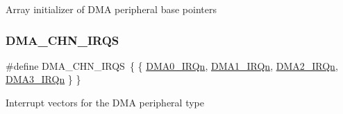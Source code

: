 Array initializer of D\+MA peripheral base pointers \mbox{\label{group___d_m_a___peripheral___access___layer_ga6defb6ef05bbbec3e07f8d2610756b7b}} 
\subsubsection{\texorpdfstring{DMA\_CHN\_IRQS}{DMA\_CHN\_IRQS}}
{\footnotesize\ttfamily \#define D\+M\+A\+\_\+\+C\+H\+N\+\_\+\+I\+R\+QS~\{ \{ \mbox{\hyperlink{group___interrupt__vector__numbers_gga666eb0caeb12ec0e281415592ae89083a54cf3bb3d65007c25a2a97568a355e09}{D\+M\+A0\+\_\+\+I\+R\+Qn}}, \mbox{\hyperlink{group___interrupt__vector__numbers_gga666eb0caeb12ec0e281415592ae89083a57600b87fbb88dd15a08ff990bcf6f28}{D\+M\+A1\+\_\+\+I\+R\+Qn}}, \mbox{\hyperlink{group___interrupt__vector__numbers_gga666eb0caeb12ec0e281415592ae89083a203b0e7d071d7b0e275eec1d73e99d88}{D\+M\+A2\+\_\+\+I\+R\+Qn}}, \mbox{\hyperlink{group___interrupt__vector__numbers_gga666eb0caeb12ec0e281415592ae89083a34ecc6303d93b420da12f2e5c2c8366c}{D\+M\+A3\+\_\+\+I\+R\+Qn}} \} \}}

Interrupt vectors for the D\+MA peripheral type 